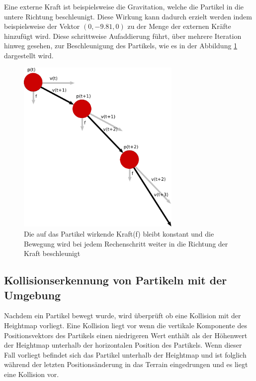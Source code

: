 \begin{Spacing}{\mylinespace}
        Eine externe Kraft ist beispielsweise die Gravitation, welche die Partikel
        in die untere Richtung beschleunigt. Diese Wirkung kann dadurch erzielt
        werden indem beispielsweise der Vektor $( 0,-9.81,0 )$ zu der Menge der externen
        Kräfte hinzufügt wird.
		Diese schrittweise Aufaddierung führt, über mehrere Iteration hinweg gesehen,
		zur Beschleunigung des Partikels, wie es in der Abbildung \ref{fig:bewmod} dargestellt wird.
		\begin{figure}[h!]
			\centering
			\vspace*{30px}
			\includegraphics[width=0.7\textwidth]{graphics/Phys_bew3.png}
			\caption{Die auf das Partikel wirkende Kraft(f) bleibt konstant und
			die Bewegung wird bei jedem Rechenschritt weiter in die Richtung der
			Kraft beschleunigt}
			\label{fig:bewmod}
		\end{figure}

    \subsection{Kollisionserkennung von Partikeln mit der Umgebung}
    	Nachdem ein Partikel bewegt wurde, wird überprüft ob eine Kollision mit
    	der Heightmap vorliegt. Eine Kollision liegt vor wenn die vertikale Komponente
    	des Positionsvektors des Partikels einen niedrigeren Wert enthält als der
    	Höhenwert der Heightmap unterhalb der horizontalen Position des Partikels. Wenn dieser Fall
    	vorliegt befindet sich das Partikel unterhalb der Heightmap und ist
    	folglich während der letzten Positionsänderung in das Terrain eingedrungen
    	und es liegt eine Kollision vor.


\end{Spacing}

